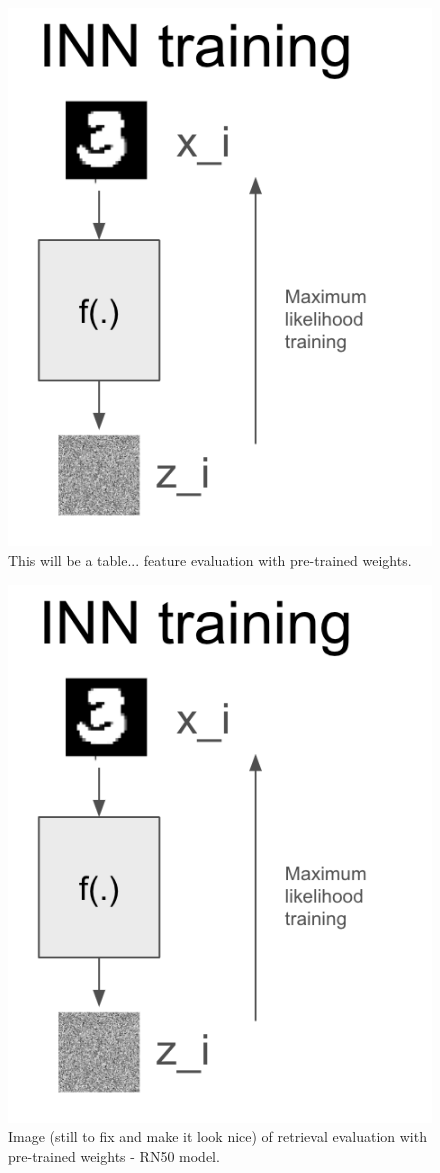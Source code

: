         
\begin{figure}
    \vskip -0.2in 
    \centering

    \includegraphics[width=0.30\columnwidth]{fig_datasynth/inn_train.png}  
            
    \vspace{-2pt}
    \caption{\label{tab:feat_extr_results_pretrained}  This will be a table... feature evaluation with pre-trained weights.}
    \vskip -0.0in 
\end{figure}

\begin{figure}
    \vskip -0.2in 
    \centering

    \includegraphics[width=0.30\columnwidth]{fig_datasynth/inn_train.png}  
            
    \vspace{-2pt}
    \caption{\label{fig:exp_feat_extr_retrieval_pretrained} Image (still to fix and make it look nice) of retrieval evaluation with pre-trained weights - RN50 model.}
    \vskip -0.0in 
\end{figure}
        

